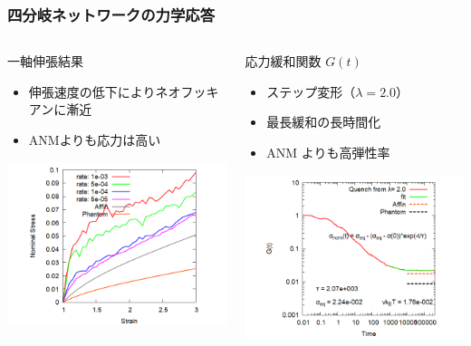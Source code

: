 \documentclass[12pt, dvipdfmx]{beamer}
\begin{document}
\begin{frame}
	\frametitle{四分岐ネットワークの力学応答}
		\begin{columns}[T, onlytextwidth]
				\begin{block}{一軸伸張結果}
					\begin{itemize}
						\item 伸張速度の低下によりネオフッキアンに漸近
						\item ANMよりも応力は高い
					\end{itemize}
					\includegraphics[width=\textwidth]{N48_C4_M3.png}
				\end{block}
				
				\begin{block}{応力緩和関数 $G(t)$}
					\begin{itemize}
						\item ステップ変形（$\lambda=2.0$）
						\item 最長緩和の長時間化
						\item ANM よりも高弾性率
					\end{itemize}
					\includegraphics[width=\textwidth]{gt_N48_C4_M3.png}
				\end{block}
		\end{columns}
\end{frame}
\end{document}
